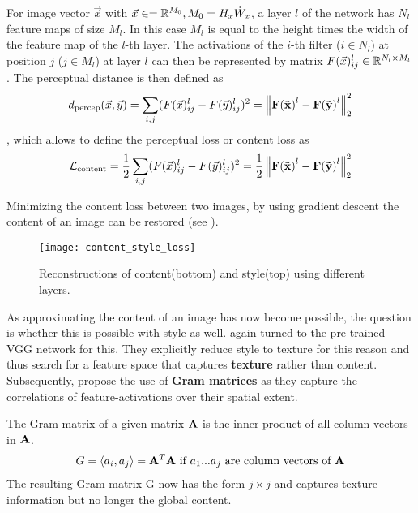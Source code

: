 For image vector $\vec{x}$ with $\vec{x} \in = \mathbb{R}^{M_0}, M_0 = H_x \dot W_x $, a layer $l$ of the network has $N_l$ feature maps of size $M_l$.
In this case $M_l$ is equal to the height times the width of the feature map of the $l$-th layer.
The activations of the $i$-th filter ($i \in N_l$) at position $j$ ($j \in M_l$) at layer $l$ can then be represented by matrix $F(\vec{x})_{ij}^l \in \mathbb{R}^{N_l \times M_l}$.
The perceptual distance is then defined as
\begin{align}
    d_{\text{percep}}(\vec{x}, \vec{y}) = \sum_{i, j} (F(\vec{x})_{ij}^l - F(\vec{y})_{ij}^l)^2 = \left\lVert\mathbf{F(\vec{x})}^l - \mathbf{F(\vec{y})}^l\right\rVert_2^2
\end{align}
, which allows to define the perceptual loss or content loss as 
\begin{align}
    \mathcal{L}_{\text{content}} = \frac{1}{2} \sum_{i, j} (F(\vec{x})_{ij}^l - F(\vec{y})_{ij}^l)^2 = \frac{1}{2} \left\lVert\mathbf{F(\vec{x})}^l - \mathbf{F(\vec{y})}^l\right\rVert_2^2
\end{align}


Minimizing the content loss between two images, by using gradient descent the content of an image can be restored (see ).

\begin{figure*}
    \texttt{[image: content\_style\_loss]}
    \caption[]{Reconstructions of content(bottom) and style(top) using different layers. \cite{gatys}}
\end{figure*}

As approximating the content of an image has now become possible, the question is whether this is possible with style as well.
\citeauthor*{gatys} again turned to the pre-trained VGG network for this.
They explicitly reduce style to texture for this reason and thus search for a feature space that captures \textbf{texture} rather than content.
Subsequently, \citeauthor*{gatys} propose the use of \textbf{Gram matrices} as they capture the correlations of feature-activations over their spatial extent.

The Gram matrix of a given matrix $\mathbf{A}$ is the inner product of all column vectors in $\mathbf{A}$.
\begin{align}
    G = \langle a_{i}, a_{j} \rangle = \mathbf{A}^T \mathbf{A} \text{ if $a_1$...$a_j$ are column vectors of $\mathbf{A}$}
\end{align}
The resulting Gram matrix G now has the form $j \times j$ and captures texture information but no longer the global content.


